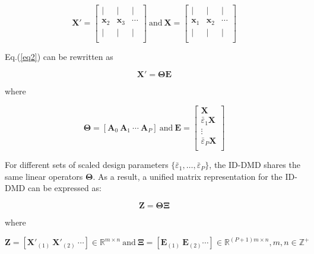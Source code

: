 \begin{equation*} 
    \mathbf{X'}=\left[\begin{matrix}
       | & | & |  \\
    \mathbf{x}_{2} & \mathbf{x}_{3} & \cdots   \\
       | & | & |  \\
    \end{matrix} \right] \ \text{and} \ \mathbf{X}=\left[\begin{matrix}
       | & | & |  \\
    \mathbf{x}_{1} & \mathbf{x}_{2} & \cdots   \\
       | & | & |  \\
    \end{matrix} \right]
\end{equation*} 

Eq.(\ref{eq2}) can be rewritten as

\begin{equation}
    \mathbf{X'}=\mathbf{\Theta E} \label{eqS3}
\end{equation}

\noindent where 

\begin{equation*}
    \mathbf{\Theta}=[\mathbf{A}_{0}\ \mathbf{A}_{1}\ \cdots \ \mathbf{A}_{P}] \ \text{and} \ \mathbf{E}=\left[\begin{matrix}
    \mathbf{X} \\
    {\bar\varepsilon_{1}}\mathbf{X} \\
    \vdots \\
    {\bar\varepsilon_{P}}\mathbf{X} \\
\end{matrix} \right]
\end{equation*}

For different sets of scaled design parameters $\{\bar\varepsilon_{1},\ldots ,\bar\varepsilon_{P}\}$, the ID-DMD shares the same linear operators $\mathbf{\Theta}$. As a result, a unified matrix representation for the ID-DMD can be expressed as: 

\begin{equation}
\mathbf{Z}=\mathbf{\Theta \Xi} \label{eqS4}
\end{equation}

\noindent where 

\begin{equation*}
    \mathbf{Z}=[{\mathbf{X'}_{(1)}}\ {\mathbf{X'}_{(2)}}\ \cdots]\in{\mathbb{R}^{m\times n}} \ \text{and} \ \mathbf{\Xi}=[{\mathbf{E}_{(1)}}\ {\mathbf{E}}_{(2)}\cdots]\in {\mathbb{R}^{(P+1)m\times n}}, m,n\in {\mathbb{Z}^{+}}
\end{equation*}

